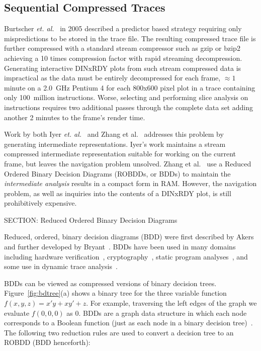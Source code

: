 {\subsection{Sequential Compressed Traces}

Burtscher \textit{et. al.}~\cite{burtscher:05:cgo} in 2005 described a predictor based strategy requiring only mispredictions to be stored in the trace file. The resulting compressed trace file is further compressed with a standard stream compressor such as gzip or bzip2 achieving a 10 times compression factor with rapid streaming decompression. Generating interactive DINxRDY plots from such stream compressed data is impractical as the data must be entirely decompressed for each frame, $\approx 1$ minute on a 2.0~GHz Pentium 4 for each 800x600 pixel plot in a trace containing only 100~million instructions.  Worse, selecting and performing slice analysis on instructions requires two additional passes through the complete data set adding another 2 minutes to the frame's render time.

Work by both Iyer \textit{et. al.}~\cite{iyer:05:epic} and Zhang et al.~\cite{zhang:04:icse} addresses this problem by generating intermediate representations. Iyer's work maintains a stream compressed intermediate representation suitable for working on the current frame, but leaves the navigation problem unsolved.  Zhang et al.~\cite{zhang:04:icse} use a Reduced Ordered Binary Decision Diagrams (ROBDDs, or BDDs) to maintain the \textit{intermediate analysis} results in a compact form in RAM. However, the navigation problem, as well as inquiries into the contents of a DINxRDY plot, is still prohibitively expensive.

SECTION: Reduced Ordered Binary Decision Diagrams


Reduced, ordered, binary decision diagrams (BDD) were first described by Akers~\cite{akers:78:itc} and further developed by Bryant~\cite{bryant:86:ieeetc}.  BDDs have been used in many domains including hardware verification~\cite{brayton:96:cav}, cryptography~\cite{krause:02:ec}, static program analyses~\cite{whaley:05:pods,whaley:04:pldi}, and some use in dynamic trace analysis~\cite{zhang:04:icse}.

BDDs can be viewed as compressed versions of binary decision trees. Figure~\ref{fig:bdtree}(a) shows a binary tree for the three variable function $f(x,y,z) = x'y + xy' + z$.  For example, traversing the left edges of the graph we evaluate $f(0,0,0)$ as $0$.  BDDs are a graph data structure in which each node corresponds to a Boolean function (just as each node in a binary decision tree)~\cite{bryant:86:ieeetc}. The following two reduction rules are used to convert a decision tree to an ROBDD (BDD henceforth):

}
